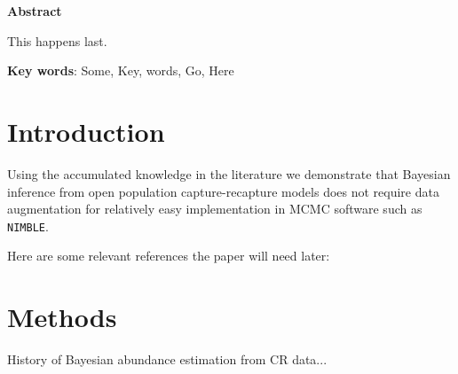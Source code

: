 \documentclass[12pt]{article}
\begin{document}
\vspace*{0.25\textheight}
\begin{center}
\begin{minipage}{0.65\paperwidth}
\renewcommand{\baselinestretch}{1}\normalsize

\centerline{\bf Abstract} 
This happens last. \bigskip

{\bf Key words}: Some, Key, words, Go, Here
\end{minipage}
\end{center}

\clearpage


\renewcommand{\baselinestretch}{1.25}\normalsize
\raggedright
\setlength{\parindent}{2em}
\raggedbottom
\linenumbers


\section{Introduction}

Using the accumulated knowledge in the literature we demonstrate that Bayesian inference from open population capture-recapture models does not require data augmentation for relatively easy implementation in MCMC software such as {\tt NIMBLE}. 

Here are some relevant references the paper will need later:
\cite{saracco2023fast}
\cite{Hooten:2023aa} 
\cite{hooten2024geostatistical}
\cite{hooten2018prior}
\cite{schwarz1996general}
\cite{Royle:2007kx}
\cite{link2013cautionary}
\cite{schofield2023estimating}
\cite{schofield201650}
\cite{link2005modeling}
\cite{johnson2010model}
\cite{king2015capture}
\cite{mcclintock2020uncovering}
\cite{glennie2019open}
\cite{zhang2023flexible}
\cite{yackulic2020need}




\section{Methods}

History of Bayesian abundance estimation from CR data... 
\end{document}
